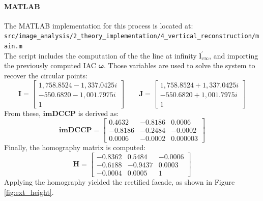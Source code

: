 \documentclass{Academic}
\begin{document}
\paragraph*{MATLAB}
The MATLAB implementation for this process is located at: \\ 
\texttt{src/image\_analysis/2\_theory\_implementation/4\_vertical\_reconstruction/main.m} \\
The script includes the computation of the the line at infinity $\mathbf{l}_{v\infty}^\prime$, and importing the previously computed IAC $\boldsymbol{\omega}$. 
Those variables are used to solve the system to recover the circular points:
\begin{equation}\mathbf{I}=\begin{bmatrix}
    1,758.8524-1,337.0425i \\ -550.6820-1,001.7975i \\ 1
\end{bmatrix} \qquad \mathbf{J}=\begin{bmatrix}
    1,758.8524+1,337.0425i \\ -550.6820+1,001.7975i \\ 1
\end{bmatrix}\end{equation}
From these, $\mathbf{imDCCP}$ is derived as:
\begin{equation}
\mathbf{imDCCP}= \begin{bmatrix}
    0.4632 & -0.8186 & 0.0006 \\ 
    -0.8186 & -0.2484 & -0.0002 \\ 
    0.0006 & -0.0002 & 0.000003
\end{bmatrix}
\end{equation}
Finally, the homography matrix is computed:
\begin{equation}\mathbf{H}=\begin{bmatrix}
     -0.8362 & 0.5484 & -0.0006 \\ 
     -0.6188 & -0.9437 & 0.0003 \\ 
     -0.0004 & 0.0005 & 1
\end{bmatrix}\end{equation}
Applying the homography yielded the rectified facade, as shown in Figure \ref{fig:ext_height}. 
\end{document}
